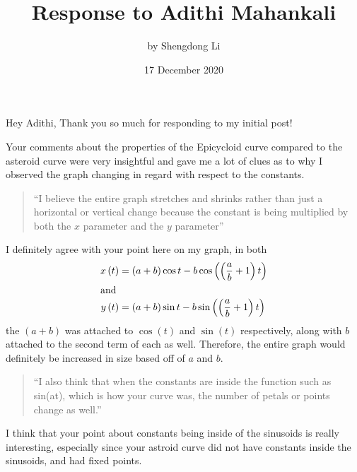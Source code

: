 \documentclass[12pt]{article}
\begin{document}
\title{Response to Adithi Mahankali}
\author{by Shengdong Li}
\date{17 December 2020}
\maketitle

Hey Adithi,
Thank you so much for responding to my initial post!

Your comments about the properties of the Epicycloid curve compared to the asteroid curve were very insightful and gave me a lot of clues as to why I observed the graph changing in regard with respect to the constants.
\begin{quote}
  ``I believe the entire graph stretches and shrinks rather than just a horizontal or vertical change because the constant is being multiplied by both the $x$ parameter and the $y$ parameter''
\end{quote}
I definitely agree with your point here on my graph, in both
\begin{align*}
  x\left(t\right)&=\left(a+b\right)\cos t-b\cos\left(\left(\frac{a}{b}+1\right)t\right)\\
  \intertext{\centering and}
  y\left(t\right)&=\left(a+b\right)\sin t-b\sin\left(\left(\frac{a}{b}+1\right)t\right)
\end{align*}
the $\left(a+b\right)$ was attached to $\cos(t)$ and $\sin(t)$ respectively, along with $b$ attached to the second term of each as well. Therefore, the entire graph would definitely be increased in size based off of $a$ and $b$.
\begin{quote}
  ``I also think that when the constants are inside the function such as sin(at), which is how your curve was, the number of petals or points change as well.''
\end{quote}
I think that your point about constants being inside of the sinusoids is really interesting, especially since your astroid curve did not have constants inside the sinusoids, and had fixed points. 
\end{document}
